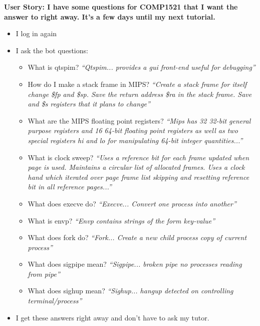 \textbf{User Story: I have some questions for COMP1521 that I want the answer to right away. It’s a few days until my next tutorial.}
\begin{itemize}
    \item{I log in again}
    \item{I ask the bot questions:}
    \begin{itemize}
        \item{What is qtspim? \textit{“Qtspim... provides a gui front-end useful for debugging”}}
        \item{How do I make a stack frame in MIPS? \textit{“Create a stack frame for itself change \$fp and \$sp. Save the return address \$ra in the stack frame. Save and \$s registers that it plans to change”}}
        \item{What are the MIPS floating point registers? \textit{“Mips has 32 32-bit general purpose registers and 16 64-bit floating point registers as well as two special registers hi and lo for manipulating 64-bit integer quantities...”}}
        \item{What is clock sweep? \textit{“Uses a reference bit for each frame updated when page is used. Maintains a circular list of allocated frames. Uses a clock hand which iterated over page frame list skipping and resetting reference bit in all reference pages...”}}
        \item{What does execve do? \textit{“Execve... Convert one process into another”}}
        \item{What is envp? \textit{“Envp contains strings of the form key-value”}}
        \item{What does fork do? \textit{“Fork... Create a new child process copy of current process”}}
        \item{What does sigpipe mean? \textit{“Sigpipe... broken pipe no processes reading from pipe”}}
        \item{What does sighup mean? \textit{“Sighup... hangup detected on controlling terminal/process”}}
    \end{itemize}
    \item{I get these answers right away and don’t have to ask my tutor.}
\end{itemize}

